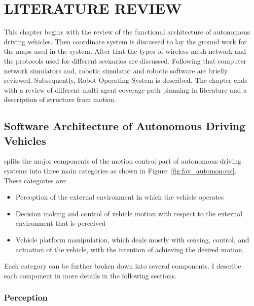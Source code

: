 \setlength{\parindent}{0pt} 
\setlength{\parskip}{0mm}
\setlength{\baselineskip}{1.6em}

\chapter{LITERATURE REVIEW}
\label{ch:literature-review}

This chapter begins with the review of the functional architecture of autonomous driving vehicles. Then coordinate system is discussed to lay the ground work for the maps used in the system. After that the types of wireless mesh network and the protocols used for different scenarios are discussed. Following that computer network simulators and, robotic simulator and robotic software are briefly reviewed. Subsequently, Robot Operating System is described. The chapter ends with a review of different multi-agent coverage path planning in literature and a description of structure from motion. 

\section{Software Architecture of Autonomous Driving Vehicles}
\label{section-name-in-literature-review}

 splits the major components of the motion control part of autonomous driving systems into three main categories as shown in Figure~\ref{fig:fav_automonous}. These categories are:

\begin{itemize}
	\item Perception of the external environment in which the vehicle operates
	\item Decision making and control of vehicle motion with respect to the external environment that is perceived
	\item Vehicle platform manipulation, which deals mostly with sensing, control, and actuation of the vehicle, with the intention of achieving the desired motion.
\end {itemize}

Each category can be further broken down into several components. I describe each component in more details in the following sections.

\subsection{Perception}

